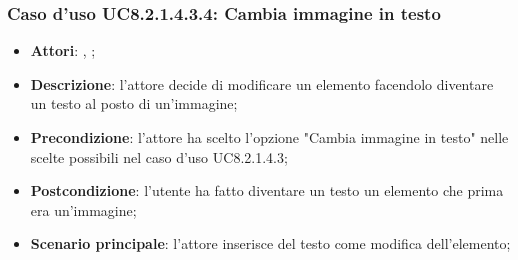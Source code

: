 		\subsubsection{Caso d'uso UC8.2.1.4.3.4: Cambia immagine in testo}
		\label{UC8.2.1.4.3.4}
		\begin{itemize}
			\item \textbf{Attori}: \uau, \uaupro;
			\item \textbf{Descrizione}: l'attore decide di modificare un elemento facendolo diventare un testo al posto di un'immagine;
			\item \textbf{Precondizione}: l'attore ha scelto l'opzione "Cambia immagine in testo" nelle scelte possibili nel caso d'uso UC8.2.1.4.3;
			\item \textbf{Postcondizione}: l'utente ha fatto diventare un testo un elemento che prima era un'immagine;
			\item \textbf{Scenario principale}: l'attore inserisce del testo come modifica dell'elemento;  
		\end{itemize}
